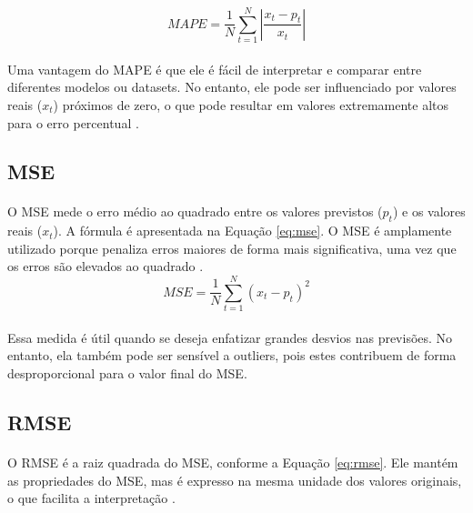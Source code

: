 \begin{equation}
	MAPE = \frac{1}{N} \sum_{t=1}^{N} \left|\frac{x_t - p_t}{x_t}\right|
	\label{eq:mape}
\end{equation}
\paragraph{} Uma vantagem do \ac{MAPE} é que ele é fácil de interpretar e comparar entre diferentes modelos ou datasets. No entanto, ele pode ser influenciado por valores reais (\(x_t\)) próximos de zero, o que pode resultar em valores extremamente altos para o erro percentual \cite{filho_mape}.

\subsection{\acf{MSE}}
\paragraph{} O \ac{MSE} mede o erro médio ao quadrado entre os valores previstos (\(p_t\)) e os valores reais (\(x_t\)). A fórmula é apresentada na Equação \ref{eq:mse}. O \ac{MSE} é amplamente utilizado porque penaliza erros maiores de forma mais significativa, uma vez que os erros são elevados ao quadrado \cite{datahackers_regressao}.
\begin{equation}
	MSE = \frac{1}{N} \sum_{t=1}^{N} (x_t - p_t)^2
	\label{eq:mse}
\end{equation}
\paragraph{} Essa medida é útil quando se deseja enfatizar grandes desvios nas previsões. No entanto, ela também pode ser sensível a outliers, pois estes contribuem de forma desproporcional para o valor final do \ac{MSE}.

\subsection{\acf{RMSE}}
\paragraph{} O \ac{RMSE} é a raiz quadrada do \ac{MSE}, conforme a Equação \ref{eq:rmse}. Ele mantém as propriedades do \ac{MSE}, mas é expresso na mesma unidade dos valores originais, o que facilita a interpretação \cite{datahackers_regressao}.

